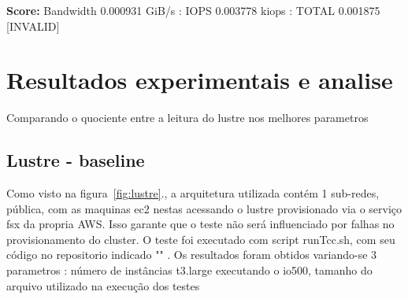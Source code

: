 \documentclass[article,a4paper,12pt,brazil,sumario=tradicional]{abntex2}
\begin{document}
\textbf{Score:} Bandwidth 0.000931 GiB/s : IOPS 0.003778 kiops : TOTAL 0.001875 [INVALID]
\section{Resultados experimentais e analise}
Comparando o quociente entre a leitura do lustre nos melhores parametros

\subsection{Lustre - baseline}
Como visto na figura~\ref{fig:lustre}., a arquitetura utilizada contém 1 sub-redes, pública, com as maquinas ec2 nestas acessando o lustre provisionado via o serviço fsx da propria AWS. Isso garante que o teste não será influenciado por falhas no provisionamento do cluster. O teste foi executado com script runTcc.sh, com seu código no repositorio indicado "" . Os resultados foram obtidos variando-se 3 parametros : número de instâncias t3.large executando o io500, tamanho do arquivo utilizado na execução dos testes
\end{document}
